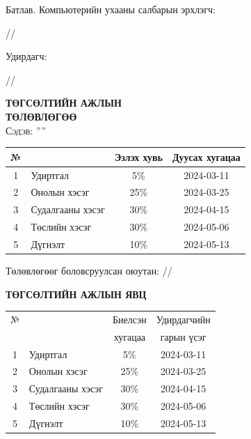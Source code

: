 \begin{titlepage}

\vspace*{0.5cm}
Батлав. Компьютерийн ухааны салбарын эрхлэгч: 
\begin{flushright}
\makebox[4cm]{\dotfill} /\chairname/ 
\end{flushright}

Удирдагч: 
\begin{flushright}
\makebox[4cm]{\dotfill} /\supname/
\end{flushright}

\begin{center}

\vspace*{2cm}
\textbf{{\large ТӨГСӨЛТИЙН АЖЛЫН \\ ТӨЛӨВЛӨГӨӨ}}\\[0.5cm]

\textsc{\large Сэдэв: ''\ttitle''}\\[0.5cm]

\begin{tabular}{|c|p{7cm}|c|c|}
	\hline
	№ & \makebox[7cm][c]{Ажлын бүлэг, хэсгийн нэр} & Эзлэх хувь & Дуусах хугацаа \\ \hline
	1 & {Удиртгал}         &  5\% & 2024-03-11 \\ \hline
	2 & {Онолын хэсэг}     & 25\% & 2024-03-25 \\ \hline
	3 & {Судалгааны хэсэг} & 30\% & 2024-04-15 \\ \hline
	4 & {Төслийн хэсэг}    & 30\% & 2024-05-06 \\ \hline
	5 & {Дүгнэлт}          & 10\% & 2024-05-13 \\ \hline
\end{tabular}

\vspace{2cm}
Төлөвлөгөөг боловсруулсан оюутан: \makebox[3cm]{\dotfill} /\shortname/

\end{center}

\newpage

\begin{center}

\vspace*{2cm}
\textbf{{\large ТӨГСӨЛТИЙН АЖЛЫН ЯВЦ}}\\[0.5cm]

\begin{tabular}{|c|p{7cm}|c|c|}
	\hline
	№ & \makebox[7cm][c]{Хийж гүйцэтгэсэн ажил} & Биелсэн     & Удирдагчийн \\
	  &                    & хугацаа    & гарын үсэг \\ \hline
	1 & {Удиртгал}         &  5\% & 2024-03-11 \\ \hline
	2 & {Онолын хэсэг}     & 25\% & 2024-03-25 \\ \hline
	3 & {Судалгааны хэсэг} & 30\% & 2024-04-15 \\ \hline
	4 & {Төслийн хэсэг}    & 30\% & 2024-05-06 \\ \hline
	5 & {Дүгнэлт}          & 10\% & 2024-05-13 \\ \hline
\end{tabular}


\end{center}
\end{titlepage}
